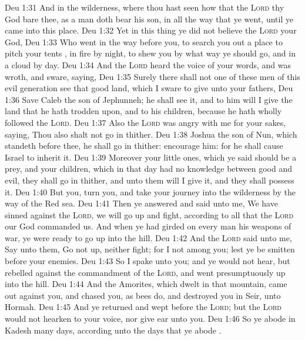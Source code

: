 \vs Deu 1:31 And in the wilderness, where thou hast seen how that the \textsc{Lord} thy God bare thee, as a man doth bear his son, in all the way that ye went, until ye came into this place.
\vs Deu 1:32 Yet in this thing ye did not believe the \textsc{Lord} your God,
\vs Deu 1:33 Who went in the way before you, to search you out a place to pitch your tents , in fire by night, to shew you by what way ye should go, and in a cloud by day.
\vs Deu 1:34 And the \textsc{Lord} heard the voice of your words, and was wroth, and sware, saying,
\vs Deu 1:35 Surely there shall not one of these men of this evil generation see that good land, which I sware to give unto your fathers,
\vs Deu 1:36 Save Caleb the son of Jephunneh; he shall see it, and to him will I give the land that he hath trodden upon, and to his children, because he hath wholly followed the \textsc{Lord}.
\vs Deu 1:37 Also the \textsc{Lord} was angry with me for your sakes, saying, Thou also shalt not go in thither.
\vs Deu 1:38  Joshua the son of Nun, which standeth before thee, he shall go in thither: encourage him: for he shall cause Israel to inherit it.
\vs Deu 1:39 Moreover your little ones, which ye said should be a prey, and your children, which in that day had no knowledge between good and evil, they shall go in thither, and unto them will I give it, and they shall possess it.
\vs Deu 1:40 But  you, turn you, and take your journey into the wilderness by the way of the Red sea.
\vs Deu 1:41 Then ye answered and said unto me, We have sinned against the \textsc{Lord}, we will go up and fight, according to all that the \textsc{Lord} our God commanded us. And when ye had girded on every man his weapons of war, ye were ready to go up into the hill.
\vs Deu 1:42 And the \textsc{Lord} said unto me, Say unto them, Go not up, neither fight; for I  not among you; lest ye be smitten before your enemies.
\vs Deu 1:43 So I spake unto you; and ye would not hear, but rebelled against the commandment of the \textsc{Lord}, and went presumptuously up into the hill.
\vs Deu 1:44 And the Amorites, which dwelt in that mountain, came out against you, and chased you, as bees do, and destroyed you in Seir,  unto Hormah.
\vs Deu 1:45 And ye returned and wept before the \textsc{Lord}; but the \textsc{Lord} would not hearken to your voice, nor give ear unto you.
\vs Deu 1:46 So ye abode in Kadesh many days, according unto the days that ye abode .
